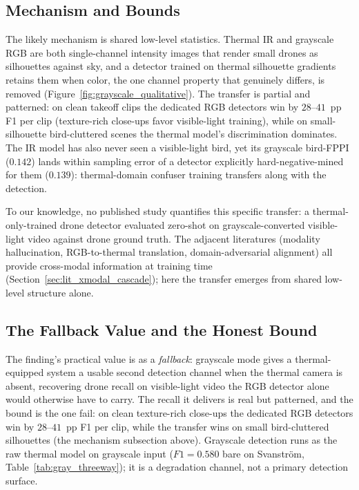 \subsection{Mechanism and Bounds}

The likely mechanism is shared low-level statistics. Thermal IR and grayscale RGB are both single-channel intensity images that render small drones as silhouettes against sky, and a detector trained on thermal silhouette gradients retains them when color, the one channel property that genuinely differs, is removed (Figure~\ref{fig:grayscale_qualitative}). The transfer is partial and patterned: on clean takeoff clips the dedicated RGB detectors win by $28$--$41$~pp F1 per clip (texture-rich close-ups favor visible-light training), while on small-silhouette bird-cluttered scenes the thermal model's discrimination dominates. The IR model has also never seen a visible-light bird, yet its grayscale bird-FPPI ($0.142$) lands within sampling error of a detector explicitly hard-negative-mined for them ($0.139$): thermal-domain confuser training transfers along with the detection.

To our knowledge, no published study quantifies this specific transfer: a thermal-only-trained drone detector evaluated zero-shot on grayscale-converted visible-light video against drone ground truth. The adjacent literatures (modality hallucination, RGB-to-thermal translation, domain-adversarial alignment) all provide cross-modal information at training time (Section~\ref{sec:lit_xmodal_cascade}); here the transfer emerges from shared low-level structure alone.

\subsection{The Fallback Value and the Honest Bound}

The finding's practical value is as a \emph{fallback}: grayscale mode gives a thermal-equipped system a usable second detection channel when the thermal camera is absent, recovering drone recall on visible-light video the RGB detector alone would otherwise have to carry. The recall it delivers is real but patterned, and the bound is the one fail: on clean texture-rich close-ups the dedicated RGB detectors win by $28$--$41$~pp F1 per clip, while the transfer wins on small bird-cluttered silhouettes (the mechanism subsection above). Grayscale detection runs as the raw thermal model on grayscale input ($F1=0.580$ bare on Svanstr\"om, Table~\ref{tab:gray_threeway}); it is a degradation channel, not a primary detection surface.

